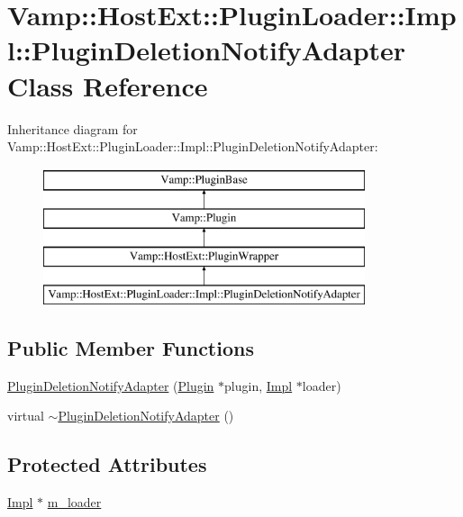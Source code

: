 \hypertarget{class_vamp_1_1_host_ext_1_1_plugin_loader_1_1_impl_1_1_plugin_deletion_notify_adapter}{}\section{Vamp\+:\+:Host\+Ext\+:\+:Plugin\+Loader\+:\+:Impl\+:\+:Plugin\+Deletion\+Notify\+Adapter Class Reference}
\label{class_vamp_1_1_host_ext_1_1_plugin_loader_1_1_impl_1_1_plugin_deletion_notify_adapter}
Inheritance diagram for Vamp\+:\+:Host\+Ext\+:\+:Plugin\+Loader\+:\+:Impl\+:\+:Plugin\+Deletion\+Notify\+Adapter\+:\begin{figure}[H]
\begin{center}
\leavevmode
\includegraphics[height=4.000000cm]{class_vamp_1_1_host_ext_1_1_plugin_loader_1_1_impl_1_1_plugin_deletion_notify_adapter}
\end{center}
\end{figure}
\subsection*{Public Member Functions}
\begin{DoxyCompactItemize}
\item 
\hyperlink{class_vamp_1_1_host_ext_1_1_plugin_loader_1_1_impl_1_1_plugin_deletion_notify_adapter_a80196e30ed72a4f45b4152a3991d7777}{Plugin\+Deletion\+Notify\+Adapter} (\hyperlink{class_vamp_1_1_plugin}{Plugin} $\ast$plugin, \hyperlink{class_vamp_1_1_host_ext_1_1_plugin_loader_1_1_impl}{Impl} $\ast$loader)
\item 
virtual \hyperlink{class_vamp_1_1_host_ext_1_1_plugin_loader_1_1_impl_1_1_plugin_deletion_notify_adapter_abb85c0134c354c0854f3868a60d0193f}{$\sim$\+Plugin\+Deletion\+Notify\+Adapter} ()
\end{DoxyCompactItemize}
\subsection*{Protected Attributes}
\begin{DoxyCompactItemize}
\item 
\hyperlink{class_vamp_1_1_host_ext_1_1_plugin_loader_1_1_impl}{Impl} $\ast$ \hyperlink{class_vamp_1_1_host_ext_1_1_plugin_loader_1_1_impl_1_1_plugin_deletion_notify_adapter_a1fb8473ea9ad73b1b6a00b92345d8397}{m\+\_\+loader}
\end{DoxyCompactItemize}
